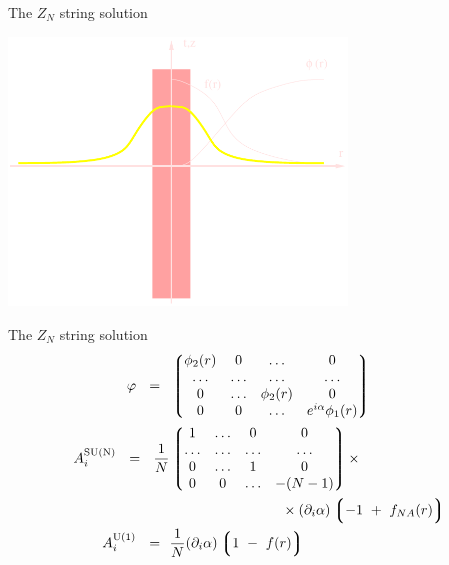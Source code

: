 \documentclass[12pt,letterpaper,landscape,KOMA,smallheadings,calcdimensions,display]{powersem}
\begin{document}
\begin{slide}
	The $ Z_N $ string solution

\begin{center}
\includegraphics[width=9.0cm]{string.pdf}
\end{center}

\end{slide}


\begin{slide}
	The $ Z_N $ string solution
\begin{align*}
%
	\varphi ~~=~~ & \lgr \begin{matrix}
			   	\phi_2(r)  & 0  & \ldots & 0 \\
				\ldots  &  \ldots & \ldots & \ldots \\
				0  & \ldots      & \phi_2(r) &  0 \\
				0  & 0           & \ldots  &   e^{i\alpha} \phi_1(r) 
			   \end{matrix}        \rgr     \\
%
	A_i^{\rm SU(N)} ~~=~~ \frac{1}{N} & \lgr \begin{matrix}
					          	1  & \ldots & 0 & 0 \\
						  	\ldots & \ldots & \ldots & \ldots \\
							0  & \ldots  & 1  &  0 \\
							0  & 0   & \ldots  &  - (N-1) 
					         \end{matrix} \rgr  \times \\
%
			&	\qquad\qquad\qquad\qquad     \times(\p_i \alpha) \lgr  -1 ~+~ f_{NA}(r) \rgr  \\
%
	A_i^{\rm U(1)} ~~=~~ & \frac{1}{N} (\p_i \alpha) \lgr 1 ~-~ f(r) \rgr
\end{align*}

\end{slide}
\end{document}
